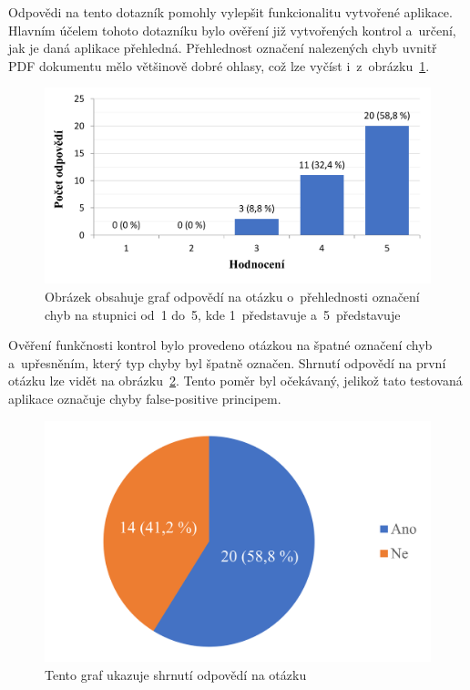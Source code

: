Odpovědi na tento dotazník pomohly vylepšit funkcionalitu vytvořené aplikace.
Hlavním účelem tohoto dotazníku bylo ověření již vytvořených kontrol a~určení,
jak je daná aplikace přehledná. Přehlednost označení nalezených chyb
uvnitř PDF dokumentu mělo většinově dobré ohlasy, což lze
vyčíst i~z~obrázku~\ref{rate_checks}.

\begin{figure}[H]
    \centering
    \includegraphics[width=0.8\linewidth]{obrazky-figures/graph1.pdf}
    \caption{
        Obrázek obsahuje graf odpovědí
        na otázku o~přehlednosti označení chyb na stupnici od~1 do~5, kde 
        1~představuje 
        a~5~představuje 
    }
    \label{rate_checks}
\end{figure}

Ověření funkčnosti kontrol bylo provedeno otázkou na špatné označení chyb
a~upřesněním, který typ chyby byl špatně označen. Shrnutí odpovědí na
první otázku lze vidět na obrázku~\ref{pic_graph_false_mistakes}.
Tento poměr byl očekávaný, jelikož tato testovaná aplikace označuje chyby
false-positive principem.

\begin{figure}[H]
    \centering
    \includegraphics[width=0.6\linewidth]{obrazky-figures/graph_false_mistakes.pdf}
    \caption{
        Tento graf ukazuje shrnutí odpovědí na otázku 
    }
    \label{pic_graph_false_mistakes}
\end{figure}

